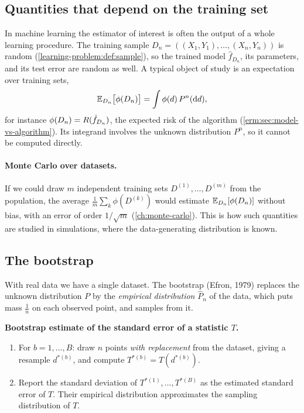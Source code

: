 \begin{notechapter}
\section{Quantities that depend on the training set}\label{stats-and-proba:sec:training-set}

In machine learning the estimator of interest is often the output of a whole
learning procedure. The training sample
$D_n = ((X_1,Y_1),\dots,(X_n,Y_n))$ is random (\cref{learning-problem:def:sample}),
so the trained model $\hat f_{D_n}$, its parameters, and its test error are
random as well. A typical object of study is an expectation over training sets,
\[
  \mathbb{E}_{D_n}\bigl[\phi(D_n)\bigr] = \int\phi(d)\,P^n(\mathrm{d}d),
\]
for instance $\phi(D_n) = R(\hat f_{D_n})$, the expected risk of the algorithm
(\cref{erm:sec:model-vs-algorithm}). Its integrand involves the unknown
distribution $P^n$, so it cannot be computed directly.

\paragraph{Monte Carlo over datasets.} If we could draw $m$ independent training
sets $D^{(1)},\dots,D^{(m)}$ from the population, the average
$\frac1m\sum_k\phi(D^{(k)})$ would estimate $\mathbb{E}_{D_n}[\phi(D_n)]$ without bias,
with an error of order $1/\sqrt m$ (\cref{ch:monte-carlo}). This is how such
quantities are studied in simulations, where the data-generating distribution is
known.

\subsection{The bootstrap}\label{stats-and-proba:sec:bootstrap}

With real data we have a single dataset. The bootstrap (Efron, 1979) replaces
the unknown distribution $P$ by the \emph{empirical distribution} $\hat P_n$ of
the data, which puts mass $\frac1n$ on each observed point, and samples from it.

\begin{center}
\begin{minipage}{0.9\linewidth}
\textbf{Bootstrap estimate of the standard error of a statistic $T$.}
\begin{enumerate}[nosep]
  \item For $b = 1,\dots,B$: draw $n$ points \emph{with replacement} from the
        dataset, giving a resample $d^{*(b)}$, and compute $T^{*(b)} = T(d^{*(b)})$.
  \item Report the standard deviation of $T^{*(1)},\dots,T^{*(B)}$ as the
        estimated standard error of $T$. Their empirical distribution
        approximates the sampling distribution of $T$.
\end{enumerate}
\end{minipage}
\end{center}


\end{notechapter}
